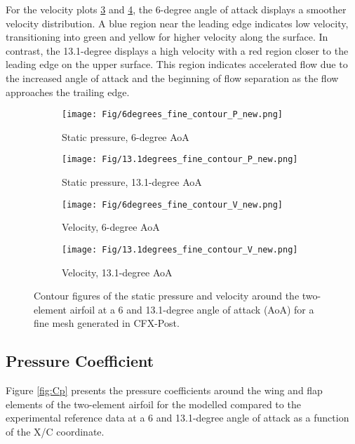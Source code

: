 For the velocity plots \ref{fig:contour6V} and \ref{fig:contour13.1V}, the 6-degree angle of attack displays a smoother velocity distribution. A blue region near the leading edge indicates low velocity, transitioning into green and yellow for higher velocity along the surface. In contrast, the 13.1-degree displays a high velocity with a red region closer to the leading edge on the upper surface. This region indicates accelerated flow due to the increased angle of attack and the beginning of flow separation as the flow approaches the trailing edge.



\begin{figure}[H]
  \centering
  \begin{subfigure}[b]{0.49\textwidth}
    \texttt{[image: Fig/6degrees\_fine\_contour\_P\_new.png]}
    \caption{Static pressure, 6-degree AoA}
    \label{fig:contour6P}
  \end{subfigure}
  \hfill
  \begin{subfigure}[b]{0.49\textwidth}
    \texttt{[image: Fig/13.1degrees\_fine\_contour\_P\_new.png]}
    \caption{Static pressure, 13.1-degree AoA}
    \label{fig:contour13.1P}
  \end{subfigure}

  \begin{subfigure}[b]{0.49\textwidth}
    \texttt{[image: Fig/6degrees\_fine\_contour\_V\_new.png]}
    \caption{Velocity, 6-degree AoA}
    \label{fig:contour6V}
  \end{subfigure}
  \hfill
  \begin{subfigure}[b]{0.49\textwidth}
    \texttt{[image: Fig/13.1degrees\_fine\_contour\_V\_new.png]}
    \caption{Velocity, 13.1-degree AoA}
    \label{fig:contour13.1V}
  \end{subfigure}

  \caption{Contour figures of the static pressure and velocity around the two-element airfoil at a 6 and 13.1-degree angle of attack (AoA) for a fine mesh generated in CFX-Post.}
  \label{fig:contour}
\end{figure}


\subsection{Pressure Coefficient}
Figure \ref{fig:Cp} presents the pressure coefficients around the wing and flap elements of the two-element airfoil for the modelled compared to the experimental reference data at a 6 and 13.1-degree angle of attack as a function of the X/C coordinate. \\

